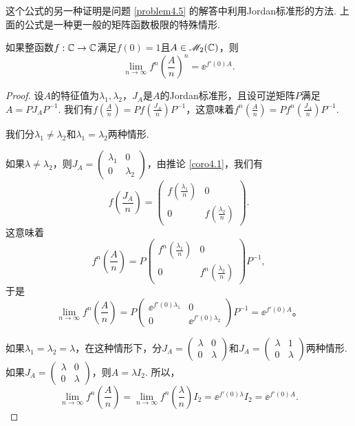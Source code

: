这个公式的另一种证明是问题 \ref{problem4.5} 的解答中利用Jordan标准形的方法. 上面的公式是一种更一般的矩阵函数极限的特殊情形.

\begin{mybox}
  \begin{theorem}[一个一般形式的指数极限.]

    如果整函数$f:\mathbb C\to\mathbb C$满足$f(0)=1$且$A\in\mathscr M_2(\mathbb C)$，则
    \[
      \lim_{n\to\infty} f^n\left(\frac An\right)^n = \ee^{f'(0)A}.
    \]
  \end{theorem}
\end{mybox}

\begin{proof}
  设$A$的特征值为$\lambda_1,\lambda_2$，$J_A$是$A$的Jordan标准形，且设可逆矩阵$P$满足$A=PJ_AP^{-1}$. 我们有$f\left(\frac An\right)=Pf\left(\frac{J_A}n\right)P^{-1}$，这意味着$f^n\left(\frac An\right)=Pf^n\left(\frac{J_A}n\right)P^{-1}$.

  我们分$\lambda_1\ne\lambda_2$和$\lambda_1=\lambda_2$两种情形.

  如果$\lambda\ne\lambda_2$，则$J_A=\begin{pmatrix}
    \lambda_1 & 0 \\
    0 & \lambda_2
  \end{pmatrix}$，由推论 \ref{coro4.1}，我们有
  \[
    f\left(\frac{J_A}n\right) = \begin{pmatrix}
      f\left(\frac{\lambda_1}n\right) & 0 \\
      0 & f\left(\frac{\lambda_2}n\right)
    \end{pmatrix}.
  \]
  这意味着
  \[
    f^n\left(\frac An\right) = P\begin{pmatrix}
      f^n\left(\frac{\lambda_1}n\right) & 0 \\
      0 & f^n\left(\frac{\lambda_2}n\right)
    \end{pmatrix}P^{-1},
  \]
  于是
  \[
    \lim_{n\to\infty}f^n\left(\frac An\right) = P\begin{pmatrix}
      \ee^{f'(0)\lambda_1} & 0 \\
      0 & \ee^{f'(0)\lambda_2}
    \end{pmatrix}P^{-1} = \ee^{f'(0)A}。
  \]

  如果$\lambda_1=\lambda_2=\lambda$，在这种情形下，分$J_A=\begin{pmatrix}
    \lambda & 0 \\
    0 & \lambda
  \end{pmatrix}$和$J_A=\begin{pmatrix}
    \lambda & 1 \\
    0 & \lambda
  \end{pmatrix}$两种情形. 如果$J_A=\begin{pmatrix}
    \lambda & 0 \\
    0 & \lambda
  \end{pmatrix}$，则$A=\lambda I_2$. 所以，
  \[
    \lim_{n\to\infty}f^n\left(\frac An\right) = \lim_{n\to\infty}f^n\left(\frac \lambda n\right) I_2 = \ee^{f'(0)\lambda}I_2 = \ee^{f'(0)A}.
  \]


\end{proof}
